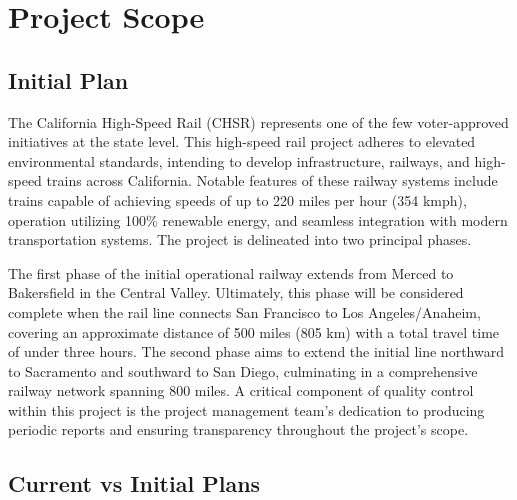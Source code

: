 \chapter{Project Scope}
\section{Initial Plan}
The California High-Speed Rail (CHSR) represents one of the few voter-approved initiatives at the state level. This high-speed rail project adheres to elevated environmental standards, intending to develop infrastructure, railways, and high-speed trains across California. Notable features of these railway systems include trains capable of achieving speeds of up to 220 miles per hour (354 kmph), operation utilizing 100\% renewable energy, and seamless integration with modern transportation systems. The project is delineated into two principal phases.

The first phase of the initial operational railway extends from Merced to Bakersfield in the Central Valley. Ultimately, this phase will be considered complete when the rail line connects San Francisco to Los Angeles/Anaheim, covering an approximate distance of 500 miles (805 km) with a total travel time of under three hours. The second phase aims to extend the initial line northward to Sacramento and southward to San Diego, culminating in a comprehensive railway network spanning 800 miles. A critical component of quality control within this project is the project management team's dedication to producing periodic reports and ensuring transparency throughout the project's scope.

\section{Current vs Initial Plans}

